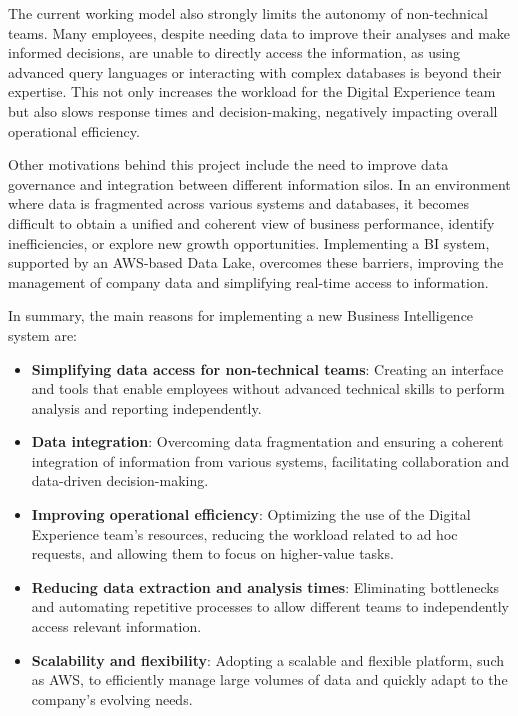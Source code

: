 The current working model also strongly limits the autonomy of non-technical teams. Many employees, despite needing data to improve their analyses and make informed decisions, are unable to directly access the information, as using advanced query languages or interacting with complex databases is beyond their expertise. This not only increases the workload for the Digital Experience team but also slows response times and decision-making, negatively impacting overall operational efficiency.

Other motivations behind this project include the need to improve data governance and integration between different information silos. In an environment where data is fragmented across various systems and databases, it becomes difficult to obtain a unified and coherent view of business performance, identify inefficiencies, or explore new growth opportunities. Implementing a \ac{BI} system, supported by an \ac{AWS}-based Data Lake, overcomes these barriers, improving the management of company data and simplifying real-time access to information.

In summary, the main reasons for implementing a new Business Intelligence system are:

\begin{itemize}
    \item \textbf{Simplifying data access for non-technical teams}: Creating an interface and tools that enable employees without advanced technical skills to perform analysis and reporting independently.
    \item \textbf{Data integration}: Overcoming data fragmentation and ensuring a coherent integration of information from various systems, facilitating collaboration and data-driven decision-making.
    \item \textbf{Improving operational efficiency}: Optimizing the use of the Digital Experience team's resources, reducing the workload related to ad hoc requests, and allowing them to focus on higher-value tasks.
    \item \textbf{Reducing data extraction and analysis times}: Eliminating bottlenecks and automating repetitive processes to allow different teams to independently access relevant information.
    \item \textbf{Scalability and flexibility}: Adopting a scalable and flexible platform, such as \ac{AWS}, to efficiently manage large volumes of data and quickly adapt to the company's evolving needs.
\end{itemize}

